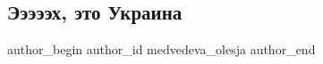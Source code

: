  
 
 
 
 
 
\subsection{Эээээх, это Украина}
\label{sec:08_12_2021.fb.medvedeva_olesja.1.eh_eto_ukraina}
 
\ifcmt
 author_begin
   author_id medvedeva_olesja
 author_end
\fi

